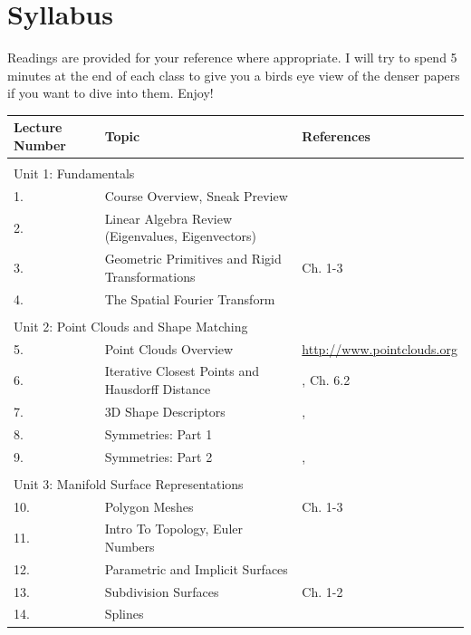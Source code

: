 \documentclass{article}
\begin{document}
\section{Syllabus}

Readings are provided for your reference where appropriate. I will try to spend 5 minutes at the end of each class to give you a birds eye view of the denser papers if you want to dive into them. Enjoy! 



\begin{tabular}{ | l | l | l | }
  \hline
  \large Lecture Number & \large Topic & \large References \\ \hline 
  \multicolumn{3}{l}{ } \\        
  \multicolumn{3}{l}{\Large Unit 1: Fundamentals} \\ \hline    
  	1. & Course Overview, Sneak Preview & \\ \hline
  	2. & Linear Algebra Review (Eigenvalues, Eigenvectors) & \\ \hline
  	3. & Geometric Primitives and Rigid Transformations & \cite{lengyel2012mathematics} Ch. 1-3 \\ \hline
  	4. & The Spatial Fourier Transform & \\ \hline

  \multicolumn{3}{l}{ } \\        
  \multicolumn{3}{l}{\Large Unit 2: Point Clouds and Shape Matching} \\ \hline 
    5. & Point Clouds Overview & \url{http://www.pointclouds.org} \\ \hline       
  	6. & Iterative Closest Points and Hausdorff Distance & \cite{chen1992object}, \cite{Bronstein2008} Ch. 6.2 \\ \hline
  	7. & 3D Shape Descriptors & \cite{ankerst19993d}, \cite{osada2002shape} \\ \hline
  	8. & Symmetries: Part 1 & \cite{thrun2005shape} \\ \hline
  	9. & Symmetries: Part 2 & \cite{kazhdan2004reflective}, \cite{podolak2006planar} \\ \hline
  	
  \multicolumn{3}{l}{ } \\        
  \multicolumn{3}{l}{\Large Unit 3: Manifold Surface Representations} \\ \hline 

  	10. & Polygon Meshes &  \cite{botsch2007geometric} Ch. 1-3 \\ \hline
  	11. & Intro To Topology, Euler Numbers & \cite{richeson2012euler} \\ \hline %
  	12. & Parametric and Implicit Surfaces &  \\ \hline       	
  	13. & Subdivision Surfaces & \cite{zorin1999subdivision} Ch. 1-2 \\ \hline
  	14. & Splines & \\ \hline



\end{tabular}
\end{document}
